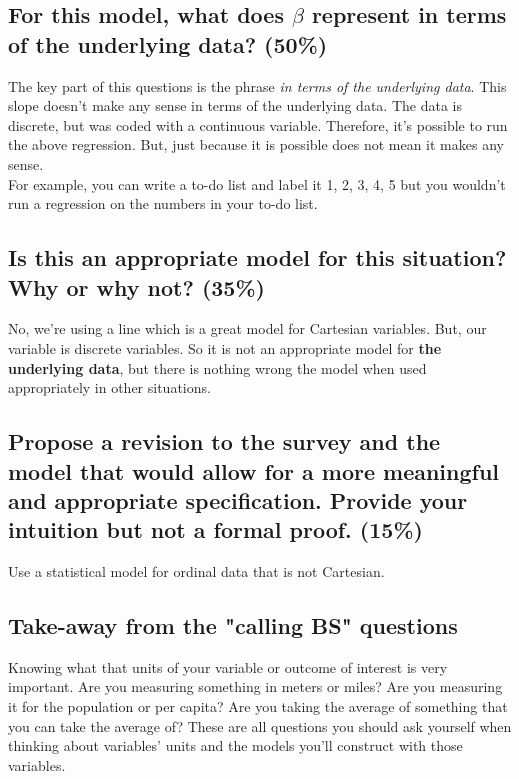 \documentclass{article}
\begin{document}
\subsection{For this model, what does $\beta$ represent in terms of the underlying data? (50\%)}

The key part of this questions is the phrase \textit{in terms of the underlying data}. This slope doesn't make any sense in terms of the underlying data. The data is discrete, but was coded with a continuous variable. Therefore, it's possible to run the above regression. But, just because it is possible does not mean it makes any sense. \\

For example, you can write a to-do list and label it 1, 2, 3, 4, 5 but you wouldn't run a regression on the numbers in your to-do list. 

\subsection{Is this an appropriate model for this situation? Why or why not? (35\%) }

No, we're using a line which is a great model for Cartesian variables. But, our variable is discrete variables. So it is not an appropriate model for \textbf{the underlying data}, but there is nothing wrong the model when used appropriately in other situations. 

\subsection{Propose a revision to the survey and the model that would allow for a more meaningful and appropriate specification. Provide your intuition but not a formal proof. (15\%)}

Use a statistical model for ordinal data that is not Cartesian. 


\subsection{Take-away from the "calling BS" questions}
Knowing what that units of your variable or outcome of interest is very important. Are you measuring something in meters or miles? Are you measuring it for the population or per capita? Are you taking the average of something that you can take the average of? These are all questions you should ask yourself when thinking about variables' units and the models you'll construct with those variables. 
\end{document}
